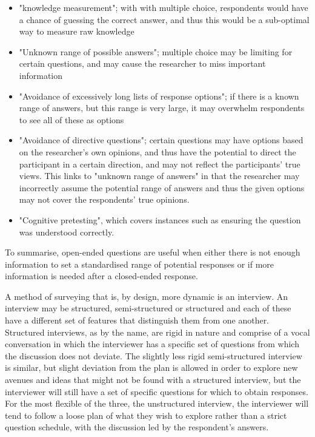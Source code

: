 \documentclass[
  12pt,
  twocolumn]{book}
\begin{document}
\begin{itemize}
   \item "knowledge measurement"; with with multiple choice, respondents would have a chance of guessing the correct answer, and thus this would be a sub-optimal way to measure raw knowledge
   \item "Unknown range of possible answers"; multiple choice may be limiting for certain questions, and may cause the researcher to miss important information 
   \item "Avoidance of excessively long lists of response options"; if there is a known range of answers, but this range is very large, it may overwhelm respondents to see all of these as options
   \item "Avoidance of directive questions"; certain questions may have options based on the researcher's own opinions, and thus have the potential to direct the participant in a certain direction, and may not reflect the participants' true views. This links to "unknown range of answers" in that the researcher may incorrectly assume the potential range of answers and thus the given options may not cover the respondents' true opinions.
   \item "Cognitive pretesting", which covers instances such as ensuring the question was understood correctly.
\end{itemize}

To summarise, open-ended questions are useful when either there is not
enough information to set a standardised range of potential responses or
if more information is needed after a closed-ended response.

A method of surveying that is, by design, more dynamic is an interview.
An interview may be structured, semi-structured or structured and each
of these have a different set of features that distinguish them from one
another. Structured interviews, as by the name, are rigid in nature and
comprise of a vocal conversation in which the interviewer has a specific
set of questions from which the discussion does not deviate. The
slightly less rigid semi-structured interview is similar, but slight
deviation from the plan is allowed in order to explore new avenues and
ideas that might not be found with a structured interview, but the
interviewer will still have a set of specific questions for which to
obtain responses. For the most flexible of the three, the unstructured
interview, the interviewer will tend to follow a loose plan of what they
wish to explore rather than a strict question schedule, with the
discussion led by the respondent's answers.
\end{document}

